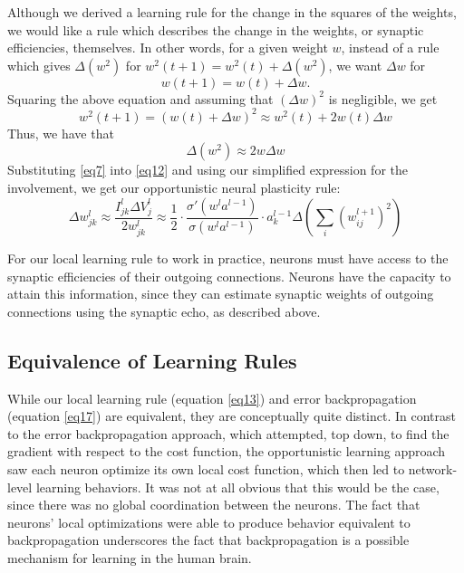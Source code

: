 \documentclass[12pt]{article}
\begin{document}
Although we derived a learning rule for the change in the squares of the weights, we would like a rule which describes the change in the weights, or synaptic efficiencies, themselves. In other words, for a given weight $w$, instead of a rule which gives $\Delta(w^2)$ for $w^2(t+1) = w^2(t) + \Delta(w^2)$, we want $\Delta w$ for
\begin{equation}
	w(t+1) = w(t) + \Delta w.
\end{equation}
Squaring the above equation and assuming that $(\Delta w)^2$ is negligible, we get
\begin{equation}
	w^2(t+1) = (w(t) + \Delta w)^2 \approx w^2(t) + 2w(t)\Delta w
\end{equation}
Thus, we have that
\begin{equation}
	\Delta (w^2) \approx 2w\Delta w\label{eq12}
\end{equation}
Substituting \ref{eq7} into \ref{eq12} and using our simplified expression for the involvement, we get our opportunistic neural plasticity rule:
\begin{equation}
	\Delta w_{jk}^l\approx \frac{I_{jk}^l \Delta V_j^l}{2w_{jk}^l}\approx\frac{1}{2}\cdot\frac{\sigma'\left(w^l a^{l-1}\right)}{\sigma\left(w^l a^{l-1}\right)}\cdot a_k^{l-1}\Delta \left(\sum_i \left(w_{ij}^{l+1}\right)^2\right)\label{eq13}
\end{equation}

For our local learning rule to work in practice, neurons must have access to the synaptic efficiencies of their outgoing connections. Neurons have the capacity to attain this information, since they can estimate synaptic weights of outgoing connections using the synaptic echo, as described above.

\subsection{Equivalence of Learning Rules}
While our local learning rule (equation \ref{eq13}) and error backpropagation (equation \ref{eq17}) are equivalent, they are conceptually quite distinct. In contrast to the error backpropagation approach, which attempted, top down, to find the gradient with respect to the cost function, the opportunistic learning approach saw each neuron optimize its own local cost function, which then led to network-level learning behaviors. It was not at all obvious that this would be the case, since there was no global coordination between the neurons. The fact that neurons' local optimizations were able to produce behavior equivalent to backpropagation underscores the fact that backpropagation is a possible mechanism for learning in the human brain.
\end{document}
